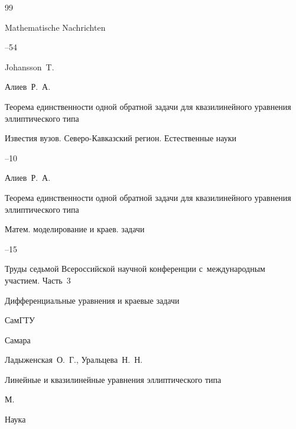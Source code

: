 \begin{thebibliography}{99}

\jour Mathematische Nachrichten 



--54

\by Johansson~T.










\by Алиев~Р.~А.

\paper Теорема единственности одной обратной задачи для квазилинейного уравнения эллиптического типа

\jour Известия вузов. Северо-Кавказский регион. Естественные науки



--10





\by Алиев~Р.~А.

\paper Теорема единственности одной обратной задачи для квазилинейного уравнения эллиптического типа

\serial Матем. моделирование и краев. задачи


--15


\inbook Труды седьмой Всероссийской научной конференции с~международным участием. \rm Часть~3

\bookinfo Дифференциальные уравнения и краевые задачи


\publ СамГТУ

\publaddr Самара






\by Ладыженская~О.~Г., Уральцева~Н.~Н.

\book Линейные и квазилинейные уравнения эллиптического типа

\publaddr М.

\publ Наука 


\end{thebibliography}

